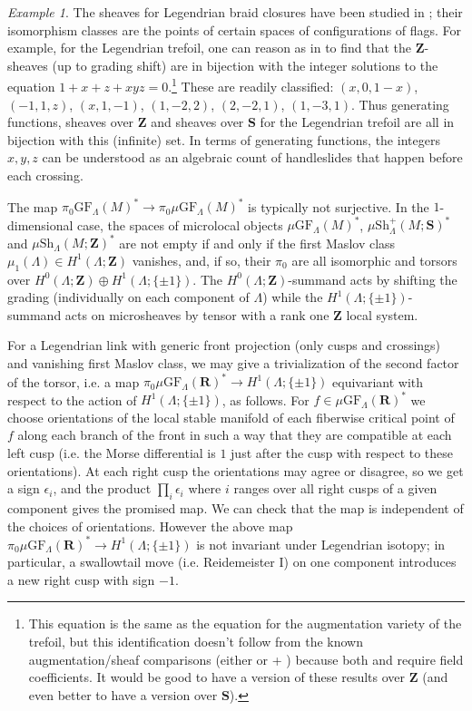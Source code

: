 \documentclass[12pt,a4paper]{article}
\numberwithin{equation}{section}
\theoremstyle{definition}
\theoremstyle{remark}
\newtheorem{example}[equation]{Example}
\newcommand{\Z}{\mathbf{Z}}
\newcommand{\R}{\mathbf{R}}
\newcommand{\Sh}{\mathrm{Sh}}
\renewcommand{\S}{\mathbf{S}}
\newcommand{\GF}{\mathrm{GF}}
\begin{document}
\begin{example}\label{ex:trefoil}
The sheaves for Legendrian braid closures have been studied in \cite{STZ, STWZ}; their isomorphism classes are the  points of certain spaces of configurations of flags. For example, for the Legendrian trefoil, one can reason as in \cite[Ex. 6.38]{STZ} to find that the $\Z$-sheaves (up to grading shift) are in bijection with the integer solutions to the equation $1+ x + z + xyz=0$.\footnote{This equation is the same as the equation for the augmentation variety of the trefoil, but this identification doesn't follow from the known augmentation/sheaf comparisons (either \cite{NRSSZ} or \cite{GPS3} + \cite{Ekholm-Lekili}) because both \cite{NRSSZ} and \cite{Ekholm-Lekili} require field coefficients.  It would be
good to have a version of these results over $\Z$ (and even better to have a version over $\S$).
}
    These are readily classified:
    $(x, 0,1-x)$, $(-1, 1, z)$, $(x, 1, -1)$,
    $(1, -2, 2)$, $(2, -2, 1)$, $(1, -3, 1)$.
    Thus generating functions, sheaves over $\Z$ and sheaves over $\S$ for the Legendrian trefoil are all in bijection with this (infinite) set.
In terms of generating functions, the integers $x,y,z$ can be understood as an algebraic count of handleslides
that happen before each crossing.
\end{example}


The map $\pi_0\GF_\Lambda(M)^*\to \pi_0\mu\GF_\Lambda(M)^*$ is typically not surjective.
In the $1$-dimensional case, the spaces of microlocal objects $\mu\GF_\Lambda(M)^*$, $\mu\Sh_\Lambda^+(M;\S)^*$ and $\mu \Sh_\Lambda(M;\Z)^*$ are not empty if and only if the first Maslov class $\mu_1(\Lambda)\in H^1(\Lambda;\Z)$ vanishes, and, if so, their $\pi_0$ are all isomorphic
and torsors over $H^0(\Lambda;\Z)\oplus H^1(\Lambda;\{\pm 1\})$.
The $H^0(\Lambda;\Z)$-summand acts by shifting the grading (individually on each component of $\Lambda$) while the $H^1(\Lambda;\{\pm 1\})$-summand acts on microsheaves by tensor with a rank one $\Z$ local system.

For a Legendrian link with generic front projection (only cusps and crossings) and vanishing first Maslov class, we may give a trivialization of the second factor of the torsor, i.e. a map $\pi_0\mu\GF_\Lambda(\R)^*\to H^1(\Lambda;\{\pm 1\})$ equivariant with respect to the action of $H^1(\Lambda;\{\pm 1\})$,
 as follows. For $f\in \mu\GF_\Lambda(\R)^*$ we choose orientations
of the local stable manifold of each fiberwise critical point of $f$ along each branch of the front in such a way
that they are compatible at each left cusp (i.e. the Morse differential is $1$ just after the cusp with respect
to these orientations). At each right cusp the orientations may agree or disagree, so we get a sign $\epsilon_i$,
and the product $\prod_i\epsilon_i$ where $i$ ranges over all right cusps of a given component gives the promised map.
We can check that the map is independent of the choices of orientations.
However the above map $\pi_0\mu\GF_\Lambda(\R)^*\to H^1(\Lambda;\{\pm 1 \})$ is not invariant under
Legendrian isotopy; in particular, a swallowtail move (i.e. Reidemeister I) on one component introduces a new right cusp with sign $-1$.
\end{document}
